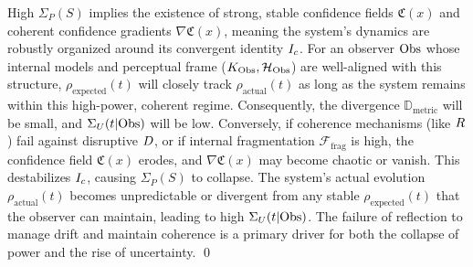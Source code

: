 \begin{demonstratio}
\label{demonstratio:bk7_coherence_fulcrum_power_certainty}
High \(\Sigma_P(S)\) implies the existence of strong, stable confidence fields \(\mathfrak{C}(x)\) and coherent confidence gradients \(\nabla \mathfrak{C}(x)\), meaning the system's dynamics are robustly organized around its convergent identity \(I_c\). For an observer \(\mathrm{Obs}\) whose internal models and perceptual frame (\(K_{\mathrm{Obs}}, \mathcal{H}_{\mathrm{Obs}}\)) are well-aligned with this structure, \(\rho_{\text{expected}}(t)\) will closely track \(\rho_{\text{actual}}(t)\) as long as the system remains within this high-power, coherent regime. Consequently, the divergence \(\mathbb{D}_{\text{metric}}\) will be small, and \(\Sigma_U(t|\mathrm{Obs})\) will be low.
Conversely, if coherence mechanisms (like \(R\)) fail against disruptive \(D\), or if internal fragmentation \(\mathcal{F}_{\text{frag}}\) is high, the confidence field \(\mathfrak{C}(x)\) erodes, and \(\nabla \mathfrak{C}(x)\) may become chaotic or vanish. This destabilizes \(I_c\), causing \(\Sigma_P(S)\) to collapse. The system's actual evolution \(\rho_{\text{actual}}(t)\) becomes unpredictable or divergent from any stable \(\rho_{\text{expected}}(t)\) that the observer can maintain, leading to high \(\Sigma_U(t|\mathrm{Obs})\). The failure of reflection to manage drift and maintain coherence is a primary driver for both the collapse of power and the rise of uncertainty. \qed
\end{demonstratio}


